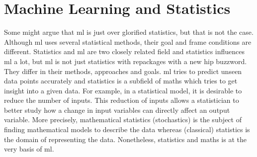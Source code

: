 \section{Machine Learning and Statistics}
Some might argue that \gls{ml} is just over glorified statistics, but that is not the case\cite{Healy2021Machine}. 
Although \gls{ml} uses several statistical methods, their goal and frame conditions are different.
%
Statistics and \gls{ml} are two closely related field and statistics influences \gls{ml} a lot, but \gls{ml} is not just statistics with repackages with a new hip buzzword. 
They differ in their methods, approaches and goals. 
%
%
\Gls{ml} tries to predict unseen data points accurately and statistics is a subfield of maths which tries to get insight into a given data. 
For example, in a statistical model, it is desirable to reduce the number of inputs. 
This reduction of inputs allows a statistician to better study how a change in input variables can directly affect an output variable\cite{gontcharov2019}.
More precisely, mathematical statistics (stochastics)\cite{haertler2014statistisch} is the subject of finding mathematical models to describe the data whereas (classical) statistics is the domain of representing the data. 
Nonetheless, statistics and maths is at the very basis of \gls{ml}.

